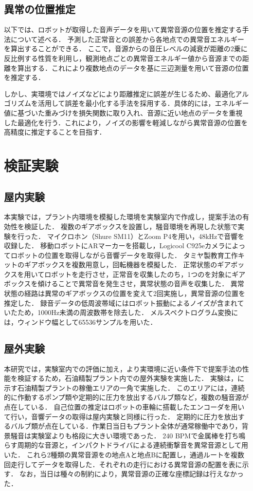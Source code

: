 \documentclass{/workdir/classes/summary}
\begin{document}
\subsection{異常の位置推定}
以下では、ロボットが取得した音声データを用いて異常音源の位置を推定する手法について述べる．
予測した正常音との誤差から各地点での異常音エネルギーを算出することができる．
ここで，音源からの音圧レベルの減衰が距離の2乗に反比例する性質を利用し，観測地点ごとの異常音エネルギー値から音源までの距離を算出する．これにより複数地点のデータを基に三辺測量を用いて音源の位置を推定する．

しかし、実環境ではノイズなどにより距離推定に誤差が生じるため、最適化アルゴリズムを活用して誤差を最小化する手法を採用する．具体的には，エネルギー値に基づいた重みづけを損失関数に取り入れ、音源に近い地点のデータを重視した最適化を行う．これにより，ノイズの影響を軽減しながら異常音源の位置を高精度に推定することを目指す．


\section{検証実験}
\subsection{屋内実験}
本実験では，プラント内環境を模擬した環境を実験室内で作成し，提案手法の有効性を検証した．
複数のギアボックスを設置し，騒音環境を再現した状態で実験を行った．
マイクロホン（Shure SM11）とZoom P4を用い，48kHzで音響を収録した．
移動ロボットにARマーカーを搭載し，Logicool C925eカメラによってロボットの位置を取得しながら音響データを取得した．
タミヤ製教育工作キットのギアボックスを複数用意し，回転機器を模擬した．
正常状態のギアボックスを用いてロボットを走行させ，正常音を収集したのち，1つのを対象にギアボックスを傾けることで異常音を発生させ，異常状態の音声を収集した．
異常状態の経路は異常のギアボックスの位置を変えて2回実施し，異常音源の位置を推定した．
録音データの低周波帯域にはロボット振動によるノイズが含まれていたため，1000Hz未満の周波数帯を除去した．
メルスペクトログラム変換には，ウィンドウ幅として65536サンプルを用いた．
\subsection{屋外実験}
本研究では，実験室内での評価に加え，より実環境に近い条件下で提案手法の性能を検証するため，石油精製プラント内での屋外実験を実施した．
実験は，に示す石油精製プラントの稼働エリアの一角で実施した．
このエリアには，連続的に作動するポンプ類や定期的に圧力を放出するバルブ類など，複数の騒音源が点在している．
自己位置の推定はロボットの車輪に搭載したエンコーダを用いて行い，音響データの取得は屋内実験と同様に行った．
定期的に圧力を放出するバルブ類が点在している．作業日当日もプラント全体が通常稼働中であり，背景騒音は実験室よりも格段に大きい環境であった．
240 BPMで金属棒を打ち鳴らす周期的な音源と，インパクトドライバによる連続衝撃音を異常音源として用いた． これら2種類の異常音源をの地点Aと地点Bに配置し，通過ルートを複数回走行してデータを取得した．それぞれの走行における異常音源の配置を表に示す．
 なお，当日は種々の制約により，異常音源の正確な座標記録は行えなかった．
\end{document}
